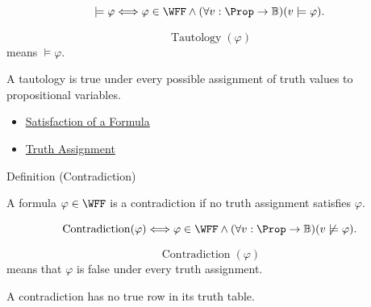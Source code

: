 \begin{remark*}
\[
\models\varphi
\Longleftrightarrow
\varphi\in\WFF
\land
(\forall v:\Prop\to\mathbb{B})(v\models\varphi).
\]
\end{remark*}

\begin{remark*}
\[
\operatorname{Tautology}(\varphi)
\]
means \(\models\varphi\).
\end{remark*}

\begin{remark*}[Interpretation]
A tautology is true under every possible assignment of truth values to propositional variables.
\end{remark*}

\begin{dependencies}
\begin{itemize}
  \item \hyperref[def:satisfaction-propositional-formula]{Satisfaction of a Formula}
  \item \hyperref[def:truth-assignment-propositional-logic]{Truth Assignment}
\end{itemize}
\end{dependencies}
\begin{definitionbox}{Definition (Contradiction)}
\begin{definition}[Contradiction]
\label{def:contradiction-propositional-logic}
A formula \(\varphi\in\WFF\) is a contradiction if no truth assignment satisfies \(\varphi\).
\end{definition}
\end{definitionbox}

\begin{remark*}
\[
\operatorname{Contradiction}(\varphi)
\Longleftrightarrow
\varphi\in\WFF
\land
(\forall v:\Prop\to\mathbb{B})(v\not\models\varphi).
\]
\end{remark*}

\begin{remark*}
\[
\operatorname{Contradiction}(\varphi)
\]
means that \(\varphi\) is false under every truth assignment.
\end{remark*}

\begin{remark*}[Interpretation]
A contradiction has no true row in its truth table.
\end{remark*}

